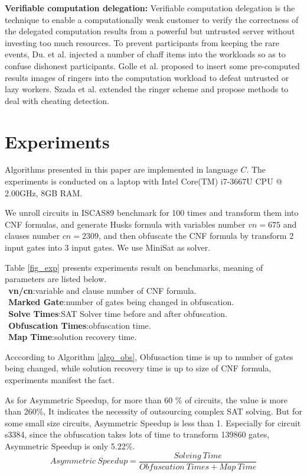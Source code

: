 \documentclass[conference]{IEEEtran}
\begin{document}
\textbf{Verifiable computation delegation:}
Verifiable computation delegation is the technique to enable
a computationally weak customer to verify the correctness of the delegated computation results
from a powerful but untrusted server without investing too much resources.
To prevent participants from keeping the rare events,
Du. et al. \cite{HV-grid} injected a number of chaff items into the workloads so as to confuse dishonest participants.
Golle et al. \cite{t32} proposed to insert some pre-computed results images of ringers
into the computation workload to defeat untrusted or lazy workers.
Szada et al. \cite{t33} extended the ringer scheme and propose methods
to deal with cheating detection.

\section{Experiments}
Algorithms presented in this paper are implemented in language $C$.
The experiments is conducted on a laptop with Intel Core(TM) i7-3667U CPU @ 2.00GHz, 8GB RAM.

We unroll circuits in ISCAS89 benchmark for 100 times and transform them into CNF formulas,
and generate Husks formula with variables number $vn=675$ and clauses number $cn=2309$,
and then obfuscate the CNF formula by transform 2 input gates into 3 input gates.
We use MiniSat as solver.

Table \ref{fig_exp} presents experiments result on benchmarks, meaning of parameters are listed below. \\
$~~$\textbf{vn/cn}:variable and clause number of CNF formula.\\
$~~$\textbf{Marked Gate}:number of gates being changed in obfuscation.\\
$~~$\textbf{Solve Times}:SAT Solver time before and after obfuscation.\\
$~~$\textbf{Obfuscation Times}:obfuscation time.\\
$~~$\textbf{Map Time}:solution recovery time.

Acccording to Algorithm \ref{algo_obs},
Obfusaction time is up to number of gates being changed, 
while solution recovery time is up to size of CNF formula,
experiments manifest the fact.

As for Asymmetric Speedup\cite{c.WANG}, for more than 60 \% of circuits, the value is more than 260\%,
It indicates the necessity of outsourcing complex SAT solving.
But for some small size circuits, 
Asymmetric Speedup is less than 1. 
Especially for circuit s3384, 
since the obfuscation takes lots of time to transform 139860 gates, Asymmetric Speedup is only 5.22\%.
\begin{equation}
 Asymmetric~Speedup= \frac{Solving~Time}{Obfuscation~Times + Map~Time} 
\end{equation}
\end{document}
